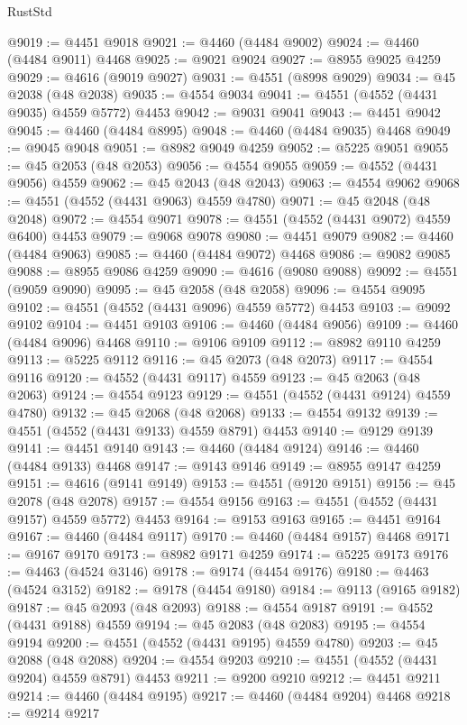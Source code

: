 \begin{lexlean}{RustStd}
\begin{coremodule}
@9019 := @4451 @9018
@9021 := @4460 (@4484 @9002)
@9024 := @4460 (@4484 @9011) @4468
@9025 := @9021 @9024
@9027 := @8955 @9025 @4259
@9029 := @4616 (@9019 @9027)
@9031 := @4551 (@8998 @9029)
@9034 := @45 @2038 (@48 @2038)
@9035 := @4554 @9034
@9041 := @4551 (@4552 (@4431 @9035) @4559 @5772) @4453
@9042 := @9031 @9041
@9043 := @4451 @9042
@9045 := @4460 (@4484 @8995)
@9048 := @4460 (@4484 @9035) @4468
@9049 := @9045 @9048
@9051 := @8982 @9049 @4259
@9052 := @5225 @9051
@9055 := @45 @2053 (@48 @2053)
@9056 := @4554 @9055
@9059 := @4552 (@4431 @9056) @4559
@9062 := @45 @2043 (@48 @2043)
@9063 := @4554 @9062
@9068 := @4551 (@4552 (@4431 @9063) @4559 @4780)
@9071 := @45 @2048 (@48 @2048)
@9072 := @4554 @9071
@9078 := @4551 (@4552 (@4431 @9072) @4559 @6400) @4453
@9079 := @9068 @9078
@9080 := @4451 @9079
@9082 := @4460 (@4484 @9063)
@9085 := @4460 (@4484 @9072) @4468
@9086 := @9082 @9085
@9088 := @8955 @9086 @4259
@9090 := @4616 (@9080 @9088)
@9092 := @4551 (@9059 @9090)
@9095 := @45 @2058 (@48 @2058)
@9096 := @4554 @9095
@9102 := @4551 (@4552 (@4431 @9096) @4559 @5772) @4453
@9103 := @9092 @9102
@9104 := @4451 @9103
@9106 := @4460 (@4484 @9056)
@9109 := @4460 (@4484 @9096) @4468
@9110 := @9106 @9109
@9112 := @8982 @9110 @4259
@9113 := @5225 @9112
@9116 := @45 @2073 (@48 @2073)
@9117 := @4554 @9116
@9120 := @4552 (@4431 @9117) @4559
@9123 := @45 @2063 (@48 @2063)
@9124 := @4554 @9123
@9129 := @4551 (@4552 (@4431 @9124) @4559 @4780)
@9132 := @45 @2068 (@48 @2068)
@9133 := @4554 @9132
@9139 := @4551 (@4552 (@4431 @9133) @4559 @8791) @4453
@9140 := @9129 @9139
@9141 := @4451 @9140
@9143 := @4460 (@4484 @9124)
@9146 := @4460 (@4484 @9133) @4468
@9147 := @9143 @9146
@9149 := @8955 @9147 @4259
@9151 := @4616 (@9141 @9149)
@9153 := @4551 (@9120 @9151)
@9156 := @45 @2078 (@48 @2078)
@9157 := @4554 @9156
@9163 := @4551 (@4552 (@4431 @9157) @4559 @5772) @4453
@9164 := @9153 @9163
@9165 := @4451 @9164
@9167 := @4460 (@4484 @9117)
@9170 := @4460 (@4484 @9157) @4468
@9171 := @9167 @9170
@9173 := @8982 @9171 @4259
@9174 := @5225 @9173
@9176 := @4463 (@4524 @3146)
@9178 := @9174 (@4454 @9176)
@9180 := @4463 (@4524 @3152)
@9182 := @9178 (@4454 @9180)
@9184 := @9113 (@9165 @9182)
@9187 := @45 @2093 (@48 @2093)
@9188 := @4554 @9187
@9191 := @4552 (@4431 @9188) @4559
@9194 := @45 @2083 (@48 @2083)
@9195 := @4554 @9194
@9200 := @4551 (@4552 (@4431 @9195) @4559 @4780)
@9203 := @45 @2088 (@48 @2088)
@9204 := @4554 @9203
@9210 := @4551 (@4552 (@4431 @9204) @4559 @8791) @4453
@9211 := @9200 @9210
@9212 := @4451 @9211
@9214 := @4460 (@4484 @9195)
@9217 := @4460 (@4484 @9204) @4468
@9218 := @9214 @9217

\end{coremodule}
\end{lexlean}

